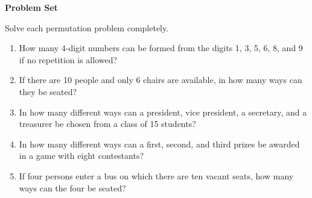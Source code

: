 \textbf{Problem Set}

\vspce

Solve each  permutation  problem completely. 

\begin{enumerate}[label = \arabic*. ]
\item How many 4-digit  numbers  can  be  formed  from  the  digits  1, 3, 5, 6,  8, and  9 if  no repetition is  allowed?
\item If there  are  10  people  and  only  6 chairs  are  available,  in  how  many ways  can they  be seated?
\item In how many different ways can a president, vice president, a secretary, and a treasurer  be chosen from a class of 15 students? 

\item In how many different ways can a first,  second,  and third prizes be awarded in a game with  eight contestants? 

\item If four persons enter a bus on which there are ten vacant seats, how many ways  can the four be seated?

\end{enumerate} 





